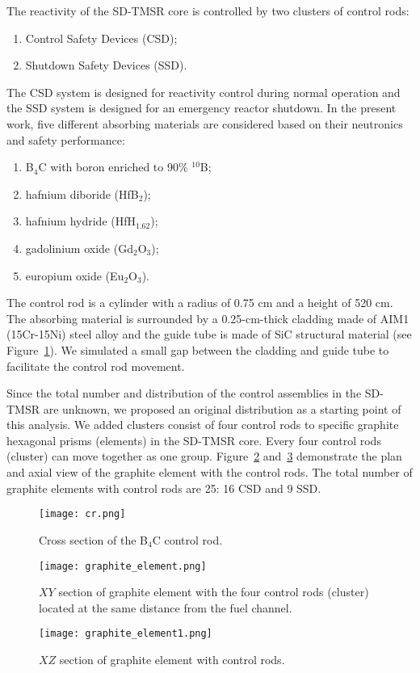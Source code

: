The reactivity of the SD-TMSR core is controlled by two clusters of control 
rods:
\begin{enumerate}
\item Control Safety Devices (CSD);
\item Shutdown Safety Devices (SSD).
\end{enumerate}
The CSD system is designed for reactivity control during normal operation and the SSD system is designed for an emergency reactor shutdown.
In the present work, five different absorbing materials are considered based on their neutronics and safety performance:
\begin{enumerate}
\item B$_4$C with boron enriched to 90\% $^{10}$B;
\item hafnium diboride (HfB$_2$);
\item hafnium hydride (HfH$_{1.62}$);
\item gadolinium oxide (Gd$_2$O$_3$);
\item europium oxide (Eu$_2$O$_3$).
\end{enumerate}

The control rod is a cylinder with a radius of 0.75 cm and a height of 520 cm. 
The absorbing material is surrounded by a 0.25-cm-thick cladding made of AIM1 
(15Cr-15Ni) steel alloy \cite{SERAN2017285} and the guide tube is made of 
SiC structural material (see Figure~\ref{fig:cr}). We simulated a small gap between the 
cladding and guide tube to facilitate the control rod movement.

Since the total number and distribution of the control assemblies in the SD-TMSR are unknown, we proposed an original distribution as a starting point of this analysis. We added clusters consist of four control rods to specific graphite hexagonal prisms (elements) in the SD-TMSR core. Every four control rods (cluster) can move together as one group. Figure~\ref{fig:graphite_elemen} and~\ref{fig:graphite_elemen1} demonstrate the plan and axial view of the graphite element with the control rods. The total number of graphite elements with control rods are 25: 16 CSD and 9 SSD.
\begin{figure}[t!]  %
	\centering
	\hspace{+0.65in} 
	\texttt{[image: cr.png]}
	\caption{Cross section of the B$_4$C control rod.}
	\label{fig:cr}
\end{figure}
\begin{figure}[t!]  %
	\centering
	\hspace{+0.65in}
	\texttt{[image: graphite\_element.png]}
	\caption{$XY$ section of graphite element with the four control rods 
	(cluster) located at the same distance from the fuel channel.}
	\label{fig:graphite_elemen}
\end{figure}
\begin{figure}[t!]  %
	\centering
	\hspace{+0.65in}
	\texttt{[image: graphite\_element1.png]}
	\caption{$XZ$ section of graphite element with control rods.}
	\label{fig:graphite_elemen1}
\end{figure}

